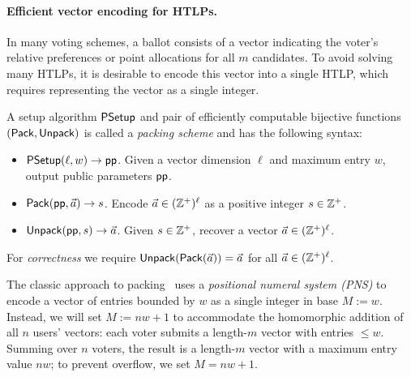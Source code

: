 \paragraph{Efficient vector encoding for HTLPs.}
In many voting schemes, a ballot consists of a vector indicating the voter's relative preferences or point allocations for all $m$ candidates. To avoid solving many HTLPs, it is desirable to encode this vector into a single HTLP, which requires representing the vector as a single integer. %

\begin{definition}\label{def:packing}
A setup algorithm $\mathsf{PSetup}$ and pair of efficiently computable bijective functions $(\mathsf{Pack},\mathsf{Unpack})$ is called a \emph{packing scheme} and has the following syntax:
    \begin{itemize}
        \item $\mathsf{PSetup}(\ell, w) \to \mathsf{pp}$. Given a vector dimension $\ell$ and maximum entry $w$, output public parameters $\mathsf{pp}$.
        \item $\mathsf{Pack}(\mathsf{pp}, \Vec{a}) \to s$. Encode $\Vec{a} \in (\mathbb{Z}^+)^\ell$ as a positive integer $s \in \mathbb{Z}^+$. 
        \item $\mathsf{Unpack}(\mathsf{pp}, s) \to \Vec{a}$. Given $s \in \mathbb{Z}^+$, recover a vector $\Vec{a} \in (\mathbb{Z}^+)^\ell$. 
    \end{itemize}
For \emph{correctness} we require $\mathsf{Unpack}(\mathsf{Pack}(\Vec{a}))=\Vec{a}$ for all $\Vec{a}\in (\mathbb{Z}^+)^\ell$.
\end{definition}

The classic approach to packing~\cite{ACNS:Groth05,EC:HirSak00} uses a \emph{positional numeral system (PNS)} to encode a vector of entries bounded by $w$ as a single integer in base $M := w$.
Instead, we will set $M:= nw+1$ to accommodate the homomorphic addition of all $n$ users' vectors: each voter submits a length-$m$ vector with entries $\leq w$. Summing over $n$ voters, the result is a length-$m$ vector with a maximum entry value $nw$; to prevent overflow, we set $M = nw+1$.


